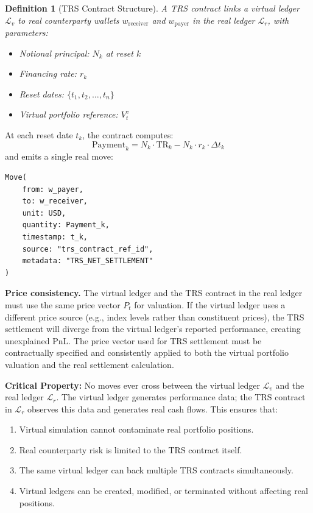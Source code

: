 \documentclass[11pt,a4paper]{article}
\newtheorem{definition}{Definition}[section]
\begin{document}
\begin{definition}[TRS Contract Structure]
A TRS contract links a virtual ledger $\mathcal{L}_v$ to real counterparty wallets $w_{\text{receiver}}$ and $w_{\text{payer}}$ in the real ledger $\mathcal{L}_r$, with parameters:
\begin{itemize}[nosep]
\item Notional principal: $N_k$ at reset $k$
\item Financing rate: $r_k$
\item Reset dates: $\{t_1, t_2, \ldots, t_n\}$
\item Virtual portfolio reference: $V^v_t$
\end{itemize}
\end{definition}

At each reset date $t_k$, the contract computes:
\[
\text{Payment}_k = N_k \cdot \text{TR}_k - N_k \cdot r_k \cdot \Delta t_k
\]
and emits a single real move:

\begin{lstlisting}
Move(
    from: w_payer,
    to: w_receiver,
    unit: USD,
    quantity: Payment_k,
    timestamp: t_k,
    source: "trs_contract_ref_id",
    metadata: "TRS_NET_SETTLEMENT"
)
\end{lstlisting}

\noindent\textbf{Price consistency.} The virtual ledger and the TRS contract in the real ledger must use the same price vector $P_t$ for valuation. If the virtual ledger uses a different price source (e.g., index levels rather than constituent prices), the TRS settlement will diverge from the virtual ledger's reported performance, creating unexplained PnL. The price vector used for TRS settlement must be contractually specified and consistently applied to both the virtual portfolio valuation and the real settlement calculation.

\noindent\textbf{Critical Property:} No moves ever cross between the virtual ledger $\mathcal{L}_v$ and the real ledger $\mathcal{L}_r$. The virtual ledger generates performance data; the TRS contract in $\mathcal{L}_r$ observes this data and generates real cash flows. This ensures that:

\begin{enumerate}[nosep]
\item Virtual simulation cannot contaminate real portfolio positions.
\item Real counterparty risk is limited to the TRS contract itself.
\item The same virtual ledger can back multiple TRS contracts simultaneously.
\item Virtual ledgers can be created, modified, or terminated without affecting real positions.
\end{enumerate}
\end{document}
